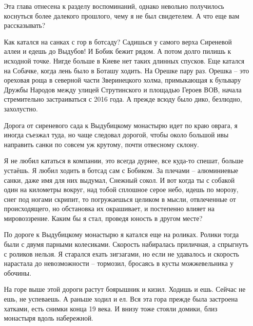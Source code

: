 Эта глава отнесена к разделу воспоминаний, однако невольно получилось коснуться более далекого прошлого, чему я не был свидетелем. А что еще вам рассказывать?

Как катался на санках с гор в ботсаду? Садишься у самого верха Сиреневой аллеи и едешь до Выдубов! И Бобик бежит рядом. А потом долго пилишь к исходной точке. Нигде больше в Киеве нет таких длинных спусков. Еще катался на Собачке, когда лень было в Боташу ходить. На Орешке пару раз. Орешка – это ореховая роща в северной части Зверинецкого холма, примыкающая к бульвару Дружбы Народов между улицей Струтинского и площадью Героев ВОВ, начала стремительно застраиваться с 2016 года. А прежде всюду было дико, безлюдно, захолустно.

Дорога от сиреневого сада к Выдубицкому монастырю идет по краю оврага, я иногда съезжал туда, но чаще следовал дорогой, чтобы около большой ивы направить санки по совсем уж крутому, почти отвесному склону.
 
Я не любил кататься в компании, это всегда дурнее, все куда-то спешат, больше устаёшь. Я любил ходить в ботсад сам с Бобиком. За плечами – алюминиевые санки, даже имя для них выдумал, Снежный сокол. И вот когда ты с собакой один на километры вокруг, над тобой сплошное серое небо, идешь по морозу, снег под ногами скрипит, то погружаешься целиком в мысли, отвлеченные от происходящего, но обстановка их окрашивает, и постепенно влияет на мировоззрение. Каким бы я стал, проведя юность в другом месте?


По дороге к Выдубицкому монастырю я катался еще на роликах. Ролики тогда были с двумя парными колесиками. Скорость набиралась приличная, а спрыгнуть с роликов нельзя. Я старался ехать зигзагами, но если не удавалось и скорость нарастала до невозможности – тормозил, бросаясь в кусты можжевельника у обочины.

На горе выше этой дороги растут боярышник и кизил. Ходишь и ешь. Сейчас не ешь, не успеваешь. А раньше ходил и ел. Вся эта гора прежде была застроена хатками, есть снимки конца 19 века. И внизу тоже стояли домики, близ монастыря вдоль набережной.

